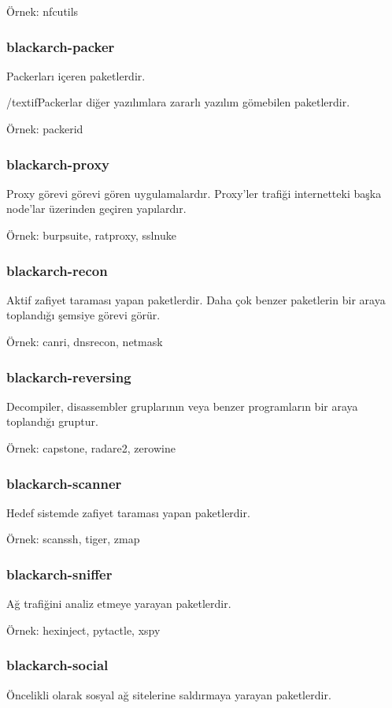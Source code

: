 \documentclass[a4paper, oneside, 11pt]{book}
\begin{document}
Örnek: nfcutils

\subsubsection{blackarch-packer}
Packerları içeren paketlerdir.

/textif{Packerlar diğer yazılımlara zararlı yazılım gömebilen paketlerdir.}

Örnek: packerid

\subsubsection{blackarch-proxy}
Proxy görevi görevi gören uygulamalardır. Proxy'ler trafiği internetteki başka node'lar üzerinden geçiren yapılardır.

Örnek: burpsuite, ratproxy, sslnuke

\subsubsection{blackarch-recon}
Aktif zafiyet taraması yapan paketlerdir. Daha çok benzer paketlerin bir araya toplandığı şemsiye görevi görür.

Örnek: canri, dnsrecon, netmask

\subsubsection{blackarch-reversing}
Decompiler, disassembler gruplarının veya benzer programların bir araya toplandığı gruptur.

Örnek: capstone, radare2, zerowine

\subsubsection{blackarch-scanner}
Hedef sistemde zafiyet taraması yapan paketlerdir.

Örnek: scanssh, tiger, zmap

\subsubsection{blackarch-sniffer}
Ağ trafiğini analiz etmeye yarayan paketlerdir.

Örnek: hexinject, pytactle, xspy

\subsubsection{blackarch-social}
Öncelikli olarak sosyal ağ sitelerine saldırmaya yarayan paketlerdir.
\end{document}
